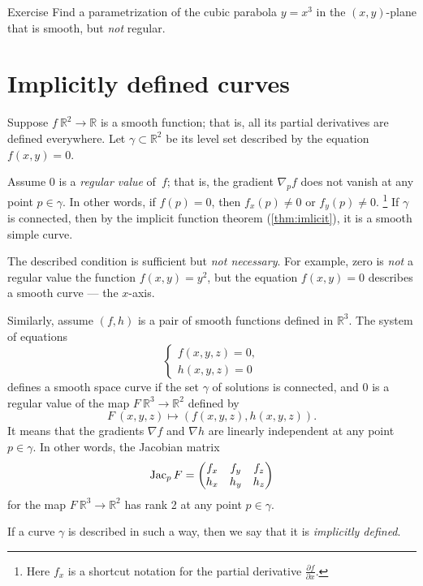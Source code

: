 \begin{thm}{Exercise}\label{ex:nonregular}
Find a parametrization of the cubic parabola $y=x^3$ in the $(x,y)$-plane that is smooth, but \textit{not} regular.
\end{thm}


\section{Implicitly defined curves}\label{sec:implicit-curves}

Suppose $f\:\mathbb{R}^2\to \mathbb{R}$ is a smooth function; 
that is, all its partial derivatives are defined everywhere.
Let $\gamma\subset \mathbb{R}^2$ be its level set described by  the equation $f(x,y)=0$.

Assume $0$ is a \emph{regular value} of~$f$; that is, the gradient $\nabla_p f$ does not vanish at any point $p\in \gamma$.
In other words, if $f(p)=0$, then   
$f_x(p)\ne 0$ or $f_y(p)\ne 0$.%
\footnote{Here $f_x$ is a shortcut notation for the partial derivative
$\tfrac{\partial f}{\partial x}$.}
If $\gamma$ is connected, then by the implicit function theorem (\ref{thm:imlicit}), it is a smooth simple curve. 

The described condition is sufficient but \textit{not necessary}.
For example, zero is \textit{not} a regular value the function $f(x,y)=y^2$, but the equation $f(x,y)=0$ describes a smooth curve --- the $x$-axis.

Similarly, assume $(f,h)$ is a pair of smooth functions defined in $\mathbb{R}^3$.
The system of equations
\[\begin{cases}
   f(x,y,z)=0,
   \\
   h(x,y,z)=0
  \end{cases}
\]
defines a smooth space curve if the set $\gamma$ of solutions is connected, and $0$ is a regular value of the map $F\:\mathbb{R}^3\to\mathbb{R}^2$ defined by
\[F\:(x,y,z)\mapsto (f(x,y,z),h(x,y,z)).\]
It means that the gradients $\nabla f$ and $\nabla h$ are linearly independent at any point $p\in \gamma$.
In other words, the Jacobian matrix
\[
\mathop{\rm Jac}\nolimits_pF=\begin{pmatrix}
f_x&f_y&f_z\\
h_x&h_y&h_z
\end{pmatrix}
\]
for the map $F\:\mathbb{R}^3\to\mathbb{R}^2$ has rank 2 at any point $p \in \gamma$.

If a curve $\gamma$ is described in such a way,
then we say that it is \emph{implicitly defined}.

